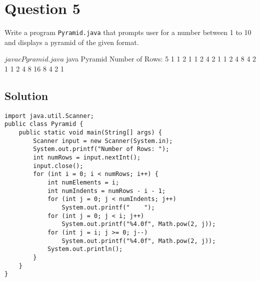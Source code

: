 \documentclass[12pt,letterpaper,twoside]{article}
\begin{document}
\newpage

\section*{Question 5}
Write a program \texttt{Pyramid.java} that prompts user for a number between 1 to 10 and displays a pyramid of the given format.

\begin{terminal}
$ javac Pyramid.java
$ java Pyramid
Number of Rows: 5
                   1
               1   2   1
           1   2   4   2   1
       1   2   4   8   4   2   1
   1   2   4   8  16   8   4   2   1
\end{terminal}

\subsection*{Solution}

\lstset{language=Java,tabsize=2}
\begin{lstlisting}
import java.util.Scanner;
public class Pyramid {
	public static void main(String[] args) {
		Scanner input = new Scanner(System.in);
		System.out.printf("Number of Rows: ");
		int numRows = input.nextInt();
		input.close();
		for (int i = 0; i < numRows; i++) {
			int numElements = i;
			int numIndents = numRows - i - 1;
			for (int j = 0; j < numIndents; j++)
				System.out.printf("    ");
			for (int j = 0; j < i; j++)
				System.out.printf("%4.0f", Math.pow(2, j));
			for (int j = i; j >= 0; j--)
				System.out.printf("%4.0f", Math.pow(2, j));
			System.out.println();
		}
	}
}
\end{lstlisting}
\end{document}
